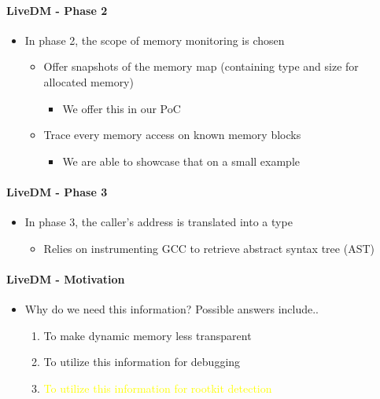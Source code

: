 \documentclass{i20lecture}
\begin{document}
\begin{frame}{\insertsection}
  \framesubtitle{LiveDM - Phase 2}
  
  \begin{itemize}
    \item In phase 2, the scope of memory monitoring is chosen
    \begin{itemize}
\pause
     \item Offer snapshots of the memory map (containing type and size for allocated memory)
     \begin{itemize}
      \item We offer this in our PoC
     \end{itemize}
\pause
     \item Trace every memory access on known memory blocks
     \begin{itemize}
      \item We are able to showcase that on a small example
     \end{itemize}
    \end{itemize}
  \end{itemize}
\end{frame}

\begin{frame}{\insertsection}
  \framesubtitle{LiveDM - Phase 3}
  
  \begin{itemize}
    \item In phase 3, the caller's address is translated into a type
\pause
    \begin{itemize}
     \item Relies on instrumenting GCC to retrieve abstract syntax tree (AST)
    \end{itemize}
  \end{itemize}
\end{frame}

\begin{frame}{\insertsection}
  \framesubtitle{LiveDM - Motivation}
  
  \begin{itemize}
    \item Why do we need this information? Possible answers include..
    \begin{enumerate}
\pause
     \item To make dynamic memory less transparent
\pause
     \item To utilize this information for debugging
\pause
     \item \textcolor{yellow}{To utilize this information for rootkit detection}
    \end{enumerate}
  \end{itemize}
\end{frame}
\end{document}
